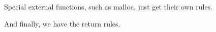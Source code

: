 \documentclass{llncs}
\begin{document}
{\extcallstep

Special external functions, such as malloc, just get their own rules.

\mallocstep

And finally, we have the return rules.

\returnstep
\retvalstep
\retnovalstep


  


}
\end{document}

